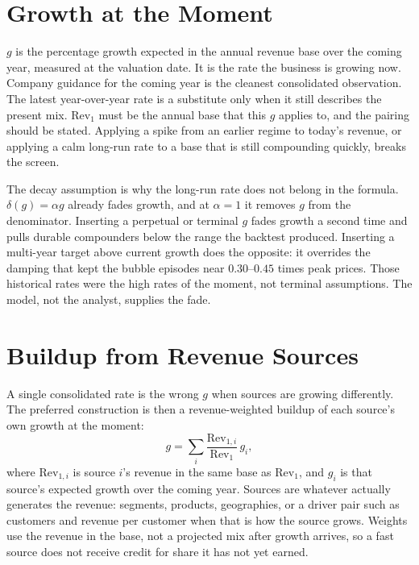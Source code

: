 \documentclass[11pt]{article}
\begin{document}
\section{Growth at the Moment}
\(g\) is the percentage growth expected in the annual revenue base over the coming year, measured at the valuation date. It is the rate the business is growing now. Company guidance for the coming year is the cleanest consolidated observation. The latest year-over-year rate is a substitute only when it still describes the present mix. \(\mathrm{Rev}_1\) must be the annual base that this \(g\) applies to, and the pairing should be stated. Applying a spike from an earlier regime to today's revenue, or applying a calm long-run rate to a base that is still compounding quickly, breaks the screen.

The decay assumption is why the long-run rate does not belong in the formula. \(\delta(g) = \alpha g\) already fades growth, and at \(\alpha = 1\) it removes \(g\) from the denominator. Inserting a perpetual or terminal \(g\) fades growth a second time and pulls durable compounders below the range the backtest produced. Inserting a multi-year target above current growth does the opposite: it overrides the damping that kept the bubble episodes near \(0.30\)--\(0.45\) times peak prices. Those historical rates were the high rates of the moment, not terminal assumptions. The model, not the analyst, supplies the fade.

\section{Buildup from Revenue Sources}
A single consolidated rate is the wrong \(g\) when sources are growing differently. The preferred construction is then a revenue-weighted buildup of each source's own growth at the moment:
\begin{equation}
g = \sum_i \frac{\mathrm{Rev}_{1,i}}{\mathrm{Rev}_1}\, g_i,
\label{eq:g-buildup}
\end{equation}
where \(\mathrm{Rev}_{1,i}\) is source \(i\)'s revenue in the same base as \(\mathrm{Rev}_1\), and \(g_i\) is that source's expected growth over the coming year. Sources are whatever actually generates the revenue: segments, products, geographies, or a driver pair such as customers and revenue per customer when that is how the source grows. Weights use the revenue in the base, not a projected mix after growth arrives, so a fast source does not receive credit for share it has not yet earned.
\end{document}
